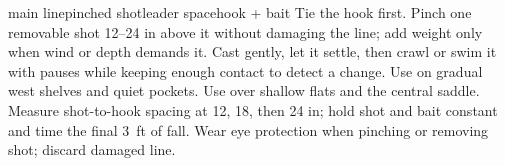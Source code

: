 
{{main line}{pinched shot}{leader space}{hook + bait}}
{Tie the hook first. Pinch one removable shot 12--24 in above it without
damaging the line; add weight only when wind or depth demands it.}
{Cast gently, let it settle, then crawl or swim it with pauses while keeping
enough contact to detect a change.}
{Use on gradual west shelves and quiet pockets.}
{Use over shallow flats and the central saddle.}
{Measure shot-to-hook spacing at 12, 18, then 24 in; hold shot and bait
constant and time the final \qty{3}{ft} of fall.}
{Wear eye protection when pinching or removing shot; discard damaged line.}
